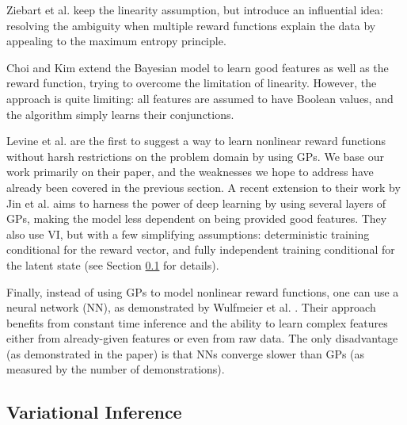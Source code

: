 \documentclass{mprop}
\theoremstyle{definition}
\begin{document}
Ziebart et al. \cite{ziebart2008maximum} keep the linearity assumption, but
introduce an influential idea: resolving the ambiguity when multiple reward
functions explain the data by appealing to the maximum entropy principle.

Choi and Kim \cite{DBLP:conf/ijcai/ChoiK13} extend the Bayesian model to learn
good features as well as the reward function, trying to overcome the limitation
of linearity. However, the approach is quite limiting: all features are assumed
to have Boolean values, and the algorithm simply learns their conjunctions.

Levine et al. \cite{DBLP:conf/nips/LevinePK11} are the first to suggest a way to
learn nonlinear reward functions without harsh restrictions on the problem
domain by using GPs. We base our work primarily on their paper, and the
weaknesses we hope to address have already been covered in the previous section.
A recent extension to their work by Jin et al. \cite{DBLP:conf/uai/JinDAS17}
aims to harness the power of deep learning by using several layers of GPs,
making the model less dependent on being provided good features. They also use
VI, but with a few simplifying assumptions: deterministic training conditional
for the reward vector, and fully independent training conditional for the latent
state (see Section \ref{sec:vi_literature} for details).

Finally, instead of using GPs to model nonlinear reward functions, one can use a
neural network (NN), as demonstrated by Wulfmeier et al.
\cite{wulfmeier2015maximum}. Their approach benefits from constant time
inference and the ability to learn complex features either from already-given
features or even from raw data. The only disadvantage (as demonstrated in the
paper) is that NNs converge slower than GPs (as measured by the number of
demonstrations).


\subsection{Variational Inference} \label{sec:vi_literature}
\end{document}
